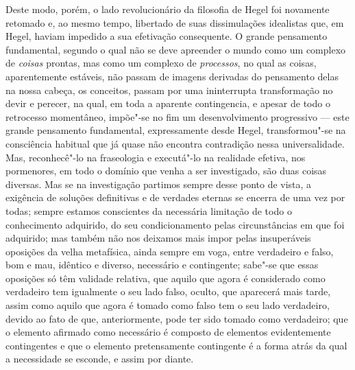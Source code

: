 Deste modo, porém, o lado revolucionário da filosofia
de Hegel foi
novamente retomado e, ao mesmo tempo, libertado de suas dissimulações
idealistas que,
em Hegel,
haviam impedido a sua efetivação consequente. O grande pensamento
fundamental, segundo o qual não se deve apreender o mundo como um
complexo de \emph{coisas }prontas, mas como um complexo
de \emph{processos}, no qual as coisas, aparentemente estáveis, não
passam de imagens derivadas do pensamento delas na nossa cabeça, os
conceitos, passam por uma ininterrupta transformação no devir e perecer,
na qual, em toda a aparente contingencia, e apesar de todo o retrocesso
momentâneo, impõe"-se no fim um desenvolvimento progressivo --- este grande
pensamento fundamental, expressamente
desde Hegel,
transformou"-se na consciência habitual que já quase não encontra
contradição nessa universalidade. Mas, reconhecê"-lo na fraseologia e
executá"-lo na realidade efetiva, nos pormenores, em todo o domínio que
venha a ser investigado, são duas coisas diversas. Mas se na
investigação partimos sempre desse ponto de vista,
 a exigência de soluções definitivas e de
verdades eternas se encerra de uma vez por todas; sempre estamos
conscientes da necessária limitação de todo o conhecimento adquirido, do
seu condicionamento pelas circunstâncias em que foi adquirido; mas
também não nos deixamos mais impor pelas insuperáveis oposições da velha
metafísica, ainda sempre em voga, entre verdadeiro e falso, bom e mau,
idêntico e diverso, necessário e contingente; sabe"-se que essas
oposições só têm validade relativa, que aquilo que agora é considerado
como verdadeiro tem igualmente o seu lado falso, oculto, que aparecerá
mais tarde, assim como aquilo que agora é tomado como falso tem o seu
lado verdadeiro, devido ao fato de que, anteriormente, pode ter sido
tomado como verdadeiro; que o elemento afirmado como necessário é
composto de elementos evidentemente contingentes e que o elemento
pretensamente contingente é a forma atrás da qual a necessidade se
esconde, e assim por diante.

